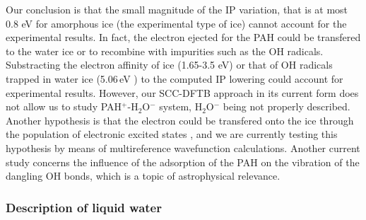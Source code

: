 \documentclass[]{interact}
\theoremstyle{plain}%
\theoremstyle{definition}
\theoremstyle{remark}
\begin{document}
Our conclusion is that the small magnitude of the IP variation, that is at most 0.8 eV for amorphous ice (the experimental type of ice) cannot account for the experimental results. In fact, the electron ejected for the PAH could be transfered to the water ice or to recombine with impurities such as the OH radicals. Substracting the electron affinity of ice (1.65-3.5 eV\cite{Novakov2004}) or that of OH radicals trapped in water ice (5.06\,eV \cite{Woon_2004})  to the computed IP lowering could account for experimental results. However, our SCC-DFTB approach in its current form does not allow us to study PAH$^{+}$-H$_2$O$^{-}$ system, H$_2$O$^{-}$ being not properly described.  Another hypothesis is that the electron could be transfered onto the ice through the population of electronic excited states \cite{Noble2017}, and we are currently testing this hypothesis by means of multireference wavefunction calculations. Another current study concerns the influence of the adsorption of the PAH on the vibration of the dangling OH bonds, which is a topic of astrophysical relevance.

\subsubsection{Description of liquid water}
\end{document}
